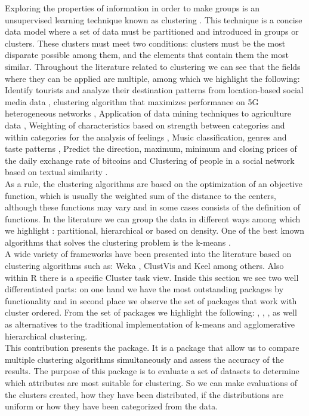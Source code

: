 Exploring the properties of information in order to make groups is an unsupervised learning technique known as clustering \citep{b46} \citep{b47}. This technique is a concise data model where a set of data must be partitioned and introduced in groups or clusters. These clusters must meet two conditions: clusters must be the most disparate possible among them, and the elements that contain them the most similar. Throughout the literature related to clustering we can see that the fields where they can be applied are multiple, among which we highlight the following: Identify tourists and analyze their destination patterns from location-based social media data \citep{b1}, clustering algorithm that maximizes performance on 5G heterogeneous networks \citep{b2}, Application of data mining techniques to agriculture data \citep{b3}, Weighting of characteristics based on strength between categories and within categories for the analysis of feelings \citep{b4}, Music classification, genres and taste patterns \citep{b5}, Predict the direction, maximum, minimum and closing prices of the daily exchange rate of bitcoins \citep{b6} and Clustering of people in a social network based on textual similarity \citep{b7}.\\
As a rule, the clustering algorithms are based on the optimization of an objective function, which is usually the weighted sum of the distance to the centers, although these functions may vary and in some cases consists of the definition of functions. In the literature we can group the data in different ways among which we highlight \citep{b48}: partitional, hierarchical or based on density. One of the best known algorithms that solves the clustering problem is the k-means \citep{b49}.\\
A wide variety of frameworks have been presented into the literature based on clustering algorithms such as: Weka \citep{b13}, ClustVis \citep{b14} and Keel \citep{b15} among others. Also within R there is a specific Cluster task view. Inside this section we see two well differentiated parts: on one hand we have the most outstanding packages by functionality and in second place we observe the set of packages that work with cluster ordered. From the set of packages we highlight the following:  \citep{b9},  \citep{b10},  \citep{b11},  \citep{b12} as well as alternatives to the traditional implementation of k-means and agglomerative hierarchical clustering.\\
This contribution presents the  package. It is a package that allow us to compare multiple clustering algorithms simultaneously and assess the accuracy of the results. The purpose of this package is to evaluate a set of datasets to determine which attributes are most suitable for clustering. So we can make evaluations of the clusters created, how they have been distributed, if the distributions are uniform or how they have been categorized from the data.\\
